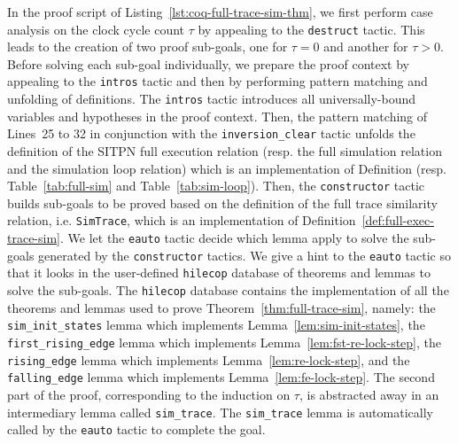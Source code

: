 In the proof script of Listing~\ref{lst:coq-full-trace-sim-thm}, we
first perform case analysis on the clock cycle count $\tau$ by
appealing to the \texttt{destruct} tactic. This leads to the creation
of two proof sub-goals, one for $\tau=0$ and another for
$\tau>0$. Before solving each sub-goal individually, we prepare the
proof context by appealing to the \texttt{intros} tactic and then by
performing pattern matching and unfolding of definitions. The
\texttt{intros} tactic introduces all universally-bound variables and
hypotheses in the proof context. Then, the pattern matching of
Lines~25 to 32 in conjunction with the \texttt{inversion\_clear}
tactic unfolds the definition of the SITPN full execution relation
(resp. the \hvhdl{} full simulation relation and the \hvhdl{}
simulation loop relation) which is an implementation of Definition
(resp. Table~\ref{tab:full-sim} and Table~\ref{tab:sim-loop}).  Then, the
\texttt{constructor} tactic builds sub-goals to be proved based on the
definition of the full trace similarity relation,
i.e. \texttt{SimTrace}, which is an implementation of
Definition~\ref{def:full-exec-trace-sim}. We let the \texttt{eauto}
tactic decide which lemma apply to solve the sub-goals generated by
the \texttt{constructor} tactics. We give a hint to the \texttt{eauto}
tactic so that it looks in the user-defined \texttt{hilecop} database
of theorems and lemmas to solve the sub-goals. The \texttt{hilecop}
database contains the \coq{} implementation of all the theorems and
lemmas used to prove Theorem~\ref{thm:full-trace-sim}, namely: the
\texttt{sim\_init\_states} lemma which implements
Lemma~\ref{lem:sim-init-states}, the \texttt{first\_rising\_edge}
lemma which implements Lemma~\ref{lem:fst-re-lock-step}, the
\texttt{rising\_edge} lemma which implements
Lemma~\ref{lem:re-lock-step}, and the \texttt{falling\_edge} lemma
which implements Lemma~\ref{lem:fe-lock-step}.  The second part of the
proof, corresponding to the induction on $\tau$, is abstracted away in
an intermediary lemma called \texttt{sim\_trace}. The
\texttt{sim\_trace} lemma is automatically called by the
\texttt{eauto} tactic to complete the goal.


